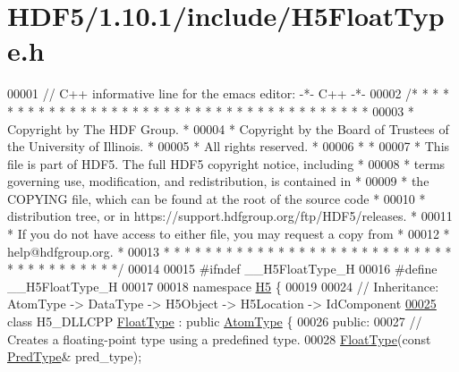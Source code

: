 \hypertarget{_h_d_f5_21_810_81_2include_2_h5_float_type_8h_source}{}\section{H\+D\+F5/1.10.1/include/\+H5\+Float\+Type.h}
\label{_h_d_f5_21_810_81_2include_2_h5_float_type_8h_source}

\begin{DoxyCode}
00001 \textcolor{comment}{// C++ informative line for the emacs editor: -*- C++ -*-}
00002 \textcolor{comment}{/* * * * * * * * * * * * * * * * * * * * * * * * * * * * * * * * * * * * * * *}
00003 \textcolor{comment}{ * Copyright by The HDF Group.                                               *}
00004 \textcolor{comment}{ * Copyright by the Board of Trustees of the University of Illinois.         *}
00005 \textcolor{comment}{ * All rights reserved.                                                      *}
00006 \textcolor{comment}{ *                                                                           *}
00007 \textcolor{comment}{ * This file is part of HDF5.  The full HDF5 copyright notice, including     *}
00008 \textcolor{comment}{ * terms governing use, modification, and redistribution, is contained in    *}
00009 \textcolor{comment}{ * the COPYING file, which can be found at the root of the source code       *}
00010 \textcolor{comment}{ * distribution tree, or in https://support.hdfgroup.org/ftp/HDF5/releases.  *}
00011 \textcolor{comment}{ * If you do not have access to either file, you may request a copy from     *}
00012 \textcolor{comment}{ * help@hdfgroup.org.                                                        *}
00013 \textcolor{comment}{ * * * * * * * * * * * * * * * * * * * * * * * * * * * * * * * * * * * * * * */}
00014 
00015 \textcolor{preprocessor}{#ifndef \_\_H5FloatType\_H}
00016 \textcolor{preprocessor}{#define \_\_H5FloatType\_H}
00017 
00018 \textcolor{keyword}{namespace }\hyperlink{namespace_h5}{H5} \{
00019 
00024 \textcolor{comment}{//  Inheritance: AtomType -> DataType -> H5Object -> H5Location -> IdComponent}
\hyperlink{class_h5_1_1_float_type}{00025} \textcolor{keyword}{class }H5\_DLLCPP \hyperlink{class_h5_1_1_float_type}{FloatType} : \textcolor{keyword}{public} \hyperlink{class_h5_1_1_atom_type}{AtomType} \{
00026    \textcolor{keyword}{public}:
00027         \textcolor{comment}{// Creates a floating-point type using a predefined type.}
00028         \hyperlink{class_h5_1_1_float_type}{FloatType}(\textcolor{keyword}{const} \hyperlink{class_h5_1_1_pred_type}{PredType}& pred\_type);

\end{DoxyCode}

